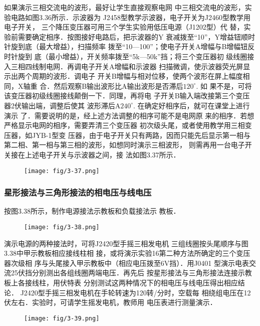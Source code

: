 如果演示三相交流电的波形，最好让学生直接观察电网
中三相交流电的波形，实验电路如图3.36所示．示波器为
J2458型教学示波器，电子开关为J2460型教学用电子开关，
三个降压变压器可用三个学生实验用低压电源（J1202型）代
替，实验前需要确定相序．按图接好电路后，把示波器的Y
衰减拨至“10”，Y增益钮顺时针旋到底（最大增益），扫描频率
拨至“10—100”；使电子开关A增幅与B增幅钮反时针旋到
底（最小增益），开关频率拨至“5k—50k”挡；将三个变压器初
级线圈接入三相四线制电网．再调电子开关A增幅和示波器
扫描微调，使示波器荧光屏显示出两个周期的波形．调电子
开关B增幅与相对位移，使两个波形在屏上幅度相同，X轴重
合．然后观察B输出波形比A输出波形是否滞后$120^{\circ}$. 如
果不是，可将该变压器初级线圈接线颠倒一下．同理，再将电
子开关B输入端改接第三个变压器2伏输出端，调整后使其
波形滞后A$240^{\circ}$. 在确定好相序后，就可在课堂上进行演示
了．需要说明的是，经上述方法调整的相序可能不是电网原
来的相序．若想严格显示电网的相序，需要弄清三个变压器
初次级头尾，或者使用教学用三相变压器，如JYB-1型变
压器，由于电子开关只有两路，因而只能先后显示第一相与
第二相、第一相与第三相的波形，如想同时演示三相波形，
则需再用一台电子开关接在上述电子开关与示波器之间，接
法如图3.37所示．
\begin{figure}[htp]
    \centering
\texttt{[image: fig/3-37.png]}
    \caption{}
\end{figure}

\subsubsection{星形接法与三角形接法的相电压与线电压}
按图3.38所示，制作电源接法示教板和负载接法示
教板．
\begin{figure}[htp]
    \centering
\texttt{[image: fig/3-38.png]}
    \caption{}
\end{figure}

演示电源的两种接法时，可将J2420型手摇三相发电机
三组线圈按头尾顺序与图3.38中甲示教板相应接线柱相
接，或将演示实验16第二种方法所确定的三个变压器次级相
序与头尾接入甲示教板中（相应电压拨至6V挡）．用J0401
型演示电表交流25伏挡分别测出各组线圈两端电压．再先后
按星形接法与三角形接法连接示教板上各接线柱，用伏特表
分别测试这两种情况下的相电压与线电压得出相应结论．
J2420型手摇三相发电机在手轮转速为120转/分时，空载每
相绕组电压在12伏左右．实验时，可请学生摇发电机，教师用
电压表进行测量演示．

\begin{figure}[htp]
    \centering
\texttt{[image: fig/3-39.png]}
    \caption{}
\end{figure}

